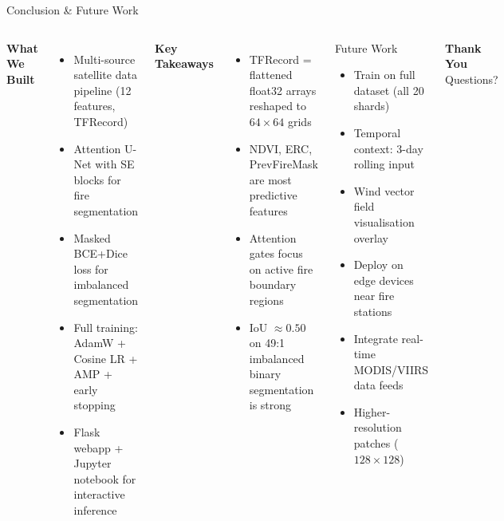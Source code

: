﻿\documentclass[aspectratio=169,t]{beamer}
\begin{document}
\begin{frame}{Conclusion \& Future Work}
\begin{columns}[t]
\textcolor{accent}{\textbf{What We Built}}
\begin{itemize}\small
  \item Multi-source satellite data pipeline (12 features, TFRecord)
  \item Attention U-Net with SE blocks for fire segmentation
  \item Masked BCE+Dice loss for imbalanced segmentation
  \item Full training: AdamW + Cosine LR + AMP + early stopping
  \item Flask webapp + Jupyter notebook for interactive inference
\end{itemize}
\vspace{0.15cm}
\textcolor{accentgreen}{\textbf{Key Takeaways}}
\begin{itemize}\small
  \item TFRecord = flattened float32 arrays reshaped to $64\times64$ grids
  \item NDVI, ERC, PrevFireMask are most predictive features
  \item Attention gates focus on active fire boundary regions
  \item IoU $\approx 0.50$ on 49:1 imbalanced binary segmentation is strong
\end{itemize}
\begin{alertblock}{Future Work}
\small
\begin{itemize}
  \item Train on full dataset (all 20 shards)
  \item Temporal context: 3-day rolling input
  \item Wind vector field visualisation overlay
  \item Deploy on edge devices near fire stations
  \item Integrate real-time MODIS/VIIRS data feeds
  \item Higher-resolution patches ($128\times128$)
\end{itemize}
\end{alertblock}
\vspace{0.5cm}
\begin{center}
  {\Large \textbf{\textcolor{firered}{Thank You}}}\\[0.3cm]
  \textcolor{textsecondary}{Questions?}
\end{center}
\end{columns}
\end{frame}
\end{document}
